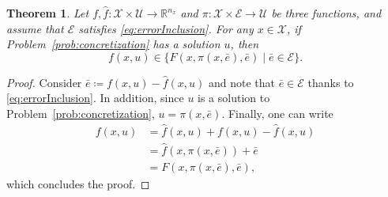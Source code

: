 \documentclass[10pt,a4paper]{amsart}
\newtheorem{theorem}{Theorem}
\newcommand{\E}{\mathcal{E}}
\newcommand{\R}{\mathbb{R}}
\newcommand{\U}{\mathcal{U}}
\newcommand{\X}{\mathcal{X}}
\begin{document}
\begin{theorem} \label{thm:overapproximation}
Let $f,\hat{f}:\X\times\U\rightarrow\R^{n_x}$ and $\pi:\X\times\E\rightarrow\U$ be three functions, and assume that $\E$ satisfies \eqref{eq:errorInclusion}. For any $x\in\X$, if Problem~\ref{prob:concretization} has a solution $u$, then
$$
f(x,u)\in \{ F(x,\pi(x,\bar{e}),\bar{e}) \mid \bar{e}\in\E \}.
$$
\end{theorem}

\begin{proof}
Consider $\bar{e} \coloneq f(x,u)-\hat{f}(x,u)$ and note that $\bar{e}\in\E$ thanks to \eqref{eq:errorInclusion}. In addition, since $u$ is a solution to Problem~\ref{prob:concretization}, $u=\pi(x,\bar{e})$. Finally, one can write
\begin{align*}
f(x,u) &= \hat{f}(x,u)+f(x,u)-\hat{f}(x,u) \\
&=\hat{f}(x,\pi(x,\bar{e}))+\bar{e} \\
&= F(x,\pi(x,\bar{e}),\bar{e}),
\end{align*}
which concludes the proof.
\end{proof}
\end{document}
